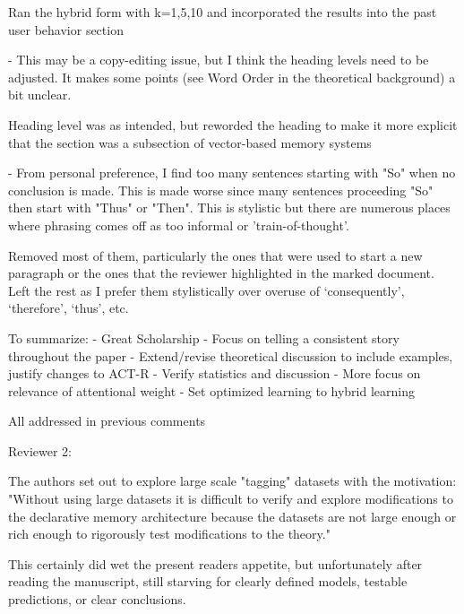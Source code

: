 \documentclass[answers,12pt]{exam}
\begin{document}
\begin{questions}
\begin{solution}
Ran the hybrid form with k=1,5,10 and incorporated the results into the past user behavior section
\end{solution}

\question - This may be a copy-editing issue, but I think the heading levels need to be adjusted. It makes some points (see Word Order in the theoretical background) a bit unclear.

\begin{solution}
Heading level was as intended, but reworded the heading to make it more explicit that the section was a subsection of vector-based memory systems
\end{solution}

\question - From personal preference, I find too many sentences starting with "So" when no conclusion is made. This is made worse since many sentences proceeding "So" then start with "Thus" or "Then". This is stylistic but there are numerous places where phrasing comes off as too informal or 'train-of-thought'. 

\begin{solution}
Removed most of them, particularly the ones that were used to start a new paragraph or the ones that the reviewer highlighted in the marked document. Left the rest as I prefer them stylistically over overuse of ‘consequently’, ‘therefore’, ‘thus’, etc.
\end{solution}

\question To summarize:
- Great Scholarship
- Focus on telling a consistent story throughout the paper
- Extend/revise theoretical discussion to include examples, justify changes to ACT-R
- Verify statistics and discussion
- More focus on relevance of attentional weight
- Set optimized learning to hybrid learning

\begin{solution}
All addressed in previous comments
\end{solution}


Reviewer 2: 

\question The authors set out to explore large scale "tagging" datasets with the motivation: "Without using large datasets it is difficult to verify and explore modifications to the declarative memory architecture because the datasets are not large enough or rich enough to rigorously test modifications to the theory."

This certainly did wet the present readers appetite, but unfortunately after reading the manuscript, still starving for clearly defined models, testable predictions, or clear conclusions. 


\end{questions}
\end{document}
